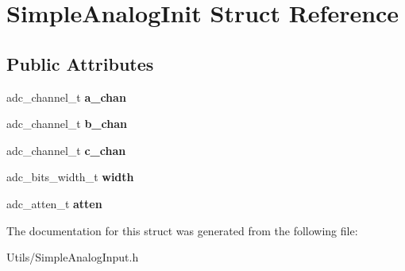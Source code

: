 \hypertarget{structSimpleAnalogInit}{}\section{Simple\+Analog\+Init Struct Reference}
\label{structSimpleAnalogInit}
\subsection*{Public Attributes}
\begin{DoxyCompactItemize}
\item 
\mbox{\label{structSimpleAnalogInit_aba1d26961c84735ef70791099d57a45c}} 
adc\+\_\+channel\+\_\+t {\bfseries a\+\_\+chan}
\item 
\mbox{\label{structSimpleAnalogInit_a5e0751b696f654596d39562201f61de0}} 
adc\+\_\+channel\+\_\+t {\bfseries b\+\_\+chan}
\item 
\mbox{\label{structSimpleAnalogInit_a771dab29755bc3ca2de31c3940fb5bf1}} 
adc\+\_\+channel\+\_\+t {\bfseries c\+\_\+chan}
\item 
\mbox{\label{structSimpleAnalogInit_a882561096789eb3e23cc73fc5f897837}} 
adc\+\_\+bits\+\_\+width\+\_\+t {\bfseries width}
\item 
\mbox{\label{structSimpleAnalogInit_ab42042f514c5fd66867f71b47c6322f1}} 
adc\+\_\+atten\+\_\+t {\bfseries atten}
\end{DoxyCompactItemize}


The documentation for this struct was generated from the following file\+:\begin{DoxyCompactItemize}
\item 
Utils/Simple\+Analog\+Input.\+h\end{DoxyCompactItemize}
